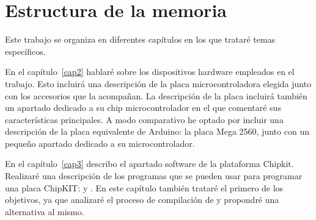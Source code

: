 \section{Estructura de la memoria}
Este trabajo se organiza en diferentes capítulos en los que trataré temas específicos.

En el capítulo~\ref{cap2} hablaré sobre los dispositivos hardware empleados en el trabajo. Esto incluirá una descripción de la placa microcontroladora elegida junto con los accesorios que la acompañan. La descripción de la placa incluirá también un apartado dedicado a su chip microcontrolador en el que comentaré sus características principales. A modo comparativo he optado por incluir una descripción de la placa equivalente de Arduino: la placa Mega 2560, junto con un pequeño apartado dedicado a su microcontrolador.

En el capítulo~\ref{cap3} describo el apartado software de la plataforma Chipkit. Realizaré una descripción de los programas que se pueden usar para programar una placa ChipKIT:  y . En este capítulo también trataré el primero de los objetivos, ya que analizaré el proceso de compilación de  y propondré una alternativa al mismo.



%
%
%
